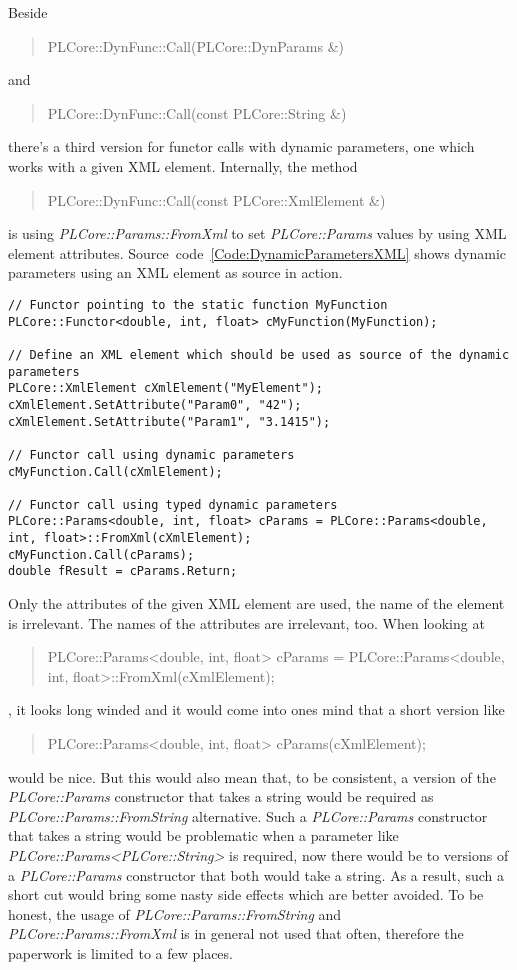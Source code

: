 Beside \begin{quote}PLCore::DynFunc::Call(PLCore::DynParams \&)\end{quote} and \begin{quote}PLCore::DynFunc::Call(const PLCore::String \&)\end{quote} there's a third version for functor calls with dynamic parameters, one which works with a given XML element. Internally, the method \begin{quote}PLCore::DynFunc::Call(const PLCore::XmlElement \&)\end{quote} is using \emph{PLCore::Params::FromXml} to set \emph{PLCore::Params} values by using XML element attributes. Source~code~\ref{Code:DynamicParametersXML} shows dynamic parameters using an XML element as source in action.
\begin{lstlisting}[label=Code:DynamicParametersXML,caption={Dynamic parameters using an XML element as source}]
// Functor pointing to the static function MyFunction
PLCore::Functor<double, int, float> cMyFunction(MyFunction);

// Define an XML element which should be used as source of the dynamic parameters
PLCore::XmlElement cXmlElement("MyElement");
cXmlElement.SetAttribute("Param0", "42");
cXmlElement.SetAttribute("Param1", "3.1415");

// Functor call using dynamic parameters
cMyFunction.Call(cXmlElement);

// Functor call using typed dynamic parameters
PLCore::Params<double, int, float> cParams = PLCore::Params<double, int, float>::FromXml(cXmlElement);
cMyFunction.Call(cParams);
double fResult = cParams.Return;
\end{lstlisting}
Only the attributes of the given XML element are used, the name of the element is irrelevant. The names of the attributes are irrelevant, too. When looking at \begin{quote}PLCore::Params<double, int, float> cParams = PLCore::Params<double, int, float>::FromXml(cXmlElement);\end{quote}, it looks long winded and it would come into ones mind that a short version like \begin{quote}PLCore::Params<double, int, float> cParams(cXmlElement);\end{quote} would be nice. But this would also mean that, to be consistent, a version of the \emph{PLCore::Params} constructor that takes a string would be required as \emph{PLCore::Params::FromString} alternative. Such a \emph{PLCore::Params} constructor that takes a string would be problematic when a parameter like \emph{PLCore::Params<PLCore::String>} is required, now there would be to versions of a \emph{PLCore::Params} constructor that both would take a string. As a result, such a short cut would bring some nasty side effects which are better avoided. To be honest, the usage of \emph{PLCore::Params::FromString} and \emph{PLCore::Params::FromXml} is in general not used that often, therefore the paperwork is limited to a few places.




